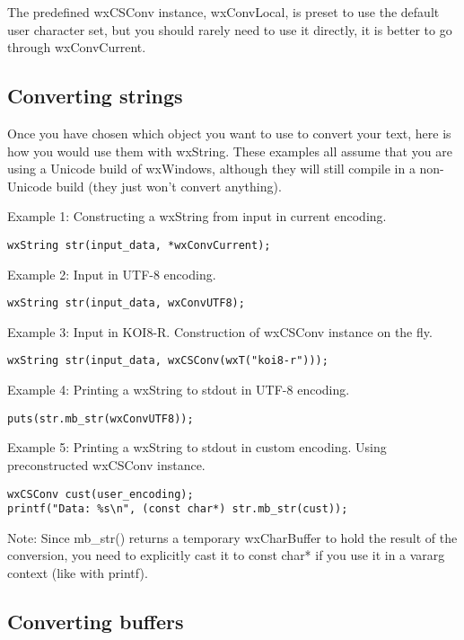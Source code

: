 The predefined wxCSConv instance, wxConvLocal, is preset to use the
default user character set, but you should rarely need to use it directly,
it is better to go through wxConvCurrent.

\subsection{Converting strings}

Once you have chosen which object you want to use to convert your text,
here is how you would use them with wxString. These examples all assume
that you are using a Unicode build of wxWindows, although they will still
compile in a non-Unicode build (they just won't convert anything).

Example 1: Constructing a wxString from input in current encoding.

\begin{verbatim}
wxString str(input_data, *wxConvCurrent);
\end{verbatim}

Example 2: Input in UTF-8 encoding.

\begin{verbatim}
wxString str(input_data, wxConvUTF8);
\end{verbatim}

Example 3: Input in KOI8-R. Construction of wxCSConv instance on the fly.

\begin{verbatim}
wxString str(input_data, wxCSConv(wxT("koi8-r")));
\end{verbatim}

Example 4: Printing a wxString to stdout in UTF-8 encoding.

\begin{verbatim}
puts(str.mb_str(wxConvUTF8));
\end{verbatim}

Example 5: Printing a wxString to stdout in custom encoding.
Using preconstructed wxCSConv instance.

\begin{verbatim}
wxCSConv cust(user_encoding);
printf("Data: %s\n", (const char*) str.mb_str(cust));
\end{verbatim}

Note: Since mb_str() returns a temporary wxCharBuffer to hold the result
of the conversion, you need to explicitly cast it to const char* if you use
it in a vararg context (like with printf).

\subsection{Converting buffers}

